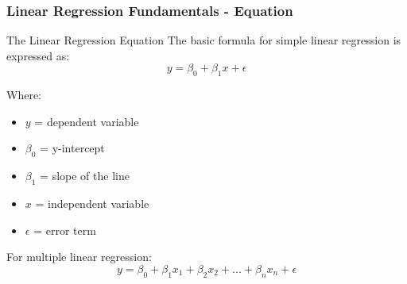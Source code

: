 \documentclass[aspectratio=169]{beamer}
\begin{document}
\begin{frame}[fragile]
  \frametitle{Linear Regression Fundamentals - Equation}
  \begin{block}{The Linear Regression Equation}
    The basic formula for simple linear regression is expressed as:
    \begin{equation}
      y = \beta_0 + \beta_1 x + \epsilon 
    \end{equation}

    Where:
    \begin{itemize}
      \item \( y \) = dependent variable
      \item \( \beta_0 \) = y-intercept
      \item \( \beta_1 \) = slope of the line
      \item \( x \) = independent variable
      \item \( \epsilon \) = error term
    \end{itemize}
    
    For multiple linear regression:
    \begin{equation}
      y = \beta_0 + \beta_1 x_1 + \beta_2 x_2 + ... + \beta_n x_n + \epsilon 
    \end{equation}
  \end{block}
\end{frame}
\end{document}
